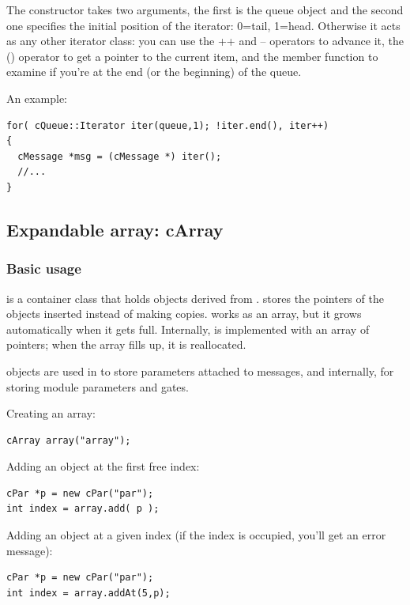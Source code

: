 The  constructor takes two arguments, the first
is the queue object and the second one specifies the initial position
of the iterator: 0=tail, 1=head. Otherwise it acts as any other
{\opp} iterator class: you can use the ++ and -- operators to advance
it, the () operator to get a pointer to the current item, and the
 member function to examine if you're at the end (or the
beginning) of the queue.


An example:

\begin{verbatim}
for( cQueue::Iterator iter(queue,1); !iter.end(), iter++)
{
  cMessage *msg = (cMessage *) iter();
  //...
}
\end{verbatim}




\subsection{Expandable array: cArray}

\subsubsection{Basic usage}


 is a container class that holds objects derived from
.  stores the pointers of the objects
inserted instead of making copies.  works as an array,
but it grows automatically when it gets full. Internally,
 is implemented with an array of pointers; when the array
fills up, it is reallocated.

 objects are used in {\opp} to store parameters
attached to messages, and internally, for storing module parameters
and gates.


Creating an array:

\begin{verbatim}
cArray array("array");
\end{verbatim}

Adding an object at the first free index:

\begin{verbatim}
cPar *p = new cPar("par");
int index = array.add( p );
\end{verbatim}


Adding an object at a given index (if the index is occupied,
you'll get an error message):

\begin{verbatim}
cPar *p = new cPar("par");
int index = array.addAt(5,p);
\end{verbatim}



